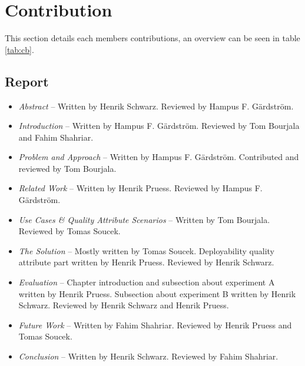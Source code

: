 \documentclass[conference]{IEEEtran}
\begin{document}


\maketitle
\IEEEpubidadjcol


\section{Contribution}
This section details each members contributions, an overview can be seen in table \ref{tab:cb}.
\subsection{Report}
\begin{itemize}
  \item \textit{Abstract} -- Written by Henrik Schwarz. Reviewed by Hampus F. Gärdström.
  \item \textit{Introduction} -- Written by Hampus F. Gärdström. Reviewed by Tom Bourjala and Fahim Shahriar.
  \item \textit{Problem and Approach} -- Written by Hampus F. Gärdström. Contributed and reviewed by Tom Bourjala.
  \item \textit{Related Work} -- Written by Henrik Pruess. Reviewed by Hampus F. Gärdström.
  \item \textit{Use Cases \& Quality Attribute Scenarios} -- Written by Tom Bourjala. Reviewed by Tomas Soucek.
  \item \textit{The Solution} -- Mostly written by Tomas Soucek. Deployability quality attribute part written by Henrik Pruess. Reviewed by Henrik Schwarz.
  \item \textit{Evaluation} -- Chapter introduction and subsection about experiment A written by Henrik Pruess. Subsection about experiment B written by Henrik Schwarz. Reviewed by Henrik Schwarz and Henrik Pruess.
  \item \textit{Future Work} -- Written by Fahim Shahriar. Reviewed by Henrik Pruess and Tomas Soucek.
  \item \textit{Conclusion} -- Written by Henrik Schwarz. Reviewed by Fahim Shahriar.
\end{itemize}
\end{document}

